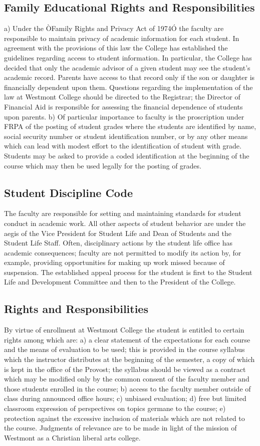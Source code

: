 \documentclass[letterpaper, 11pt]{article}
\begin{document}
	\subsection{Family Educational Rights and Responsibilities}
		a) Under the ÒFamily Rights and Privacy Act of 1974Ó the faculty are responsible to maintain privacy of academic information for each student.  In agreement with the provisions of this law the College has established the guidelines regarding access to student information.  In particular, the College has decided that only the academic advisor of a given student may see the student's academic record.  Parents have access to that record only if the son or daughter is financially dependent upon them.  Questions regarding the implementation of the law at Westmont College should be directed to the Registrar; the Director of Financial Aid is responsible for assessing the financial dependence of students upon parents.
		b) Of particular importance to faculty is the proscription under FRPA of the posting of student grades where the students are identified by name, social security number or student identification number, or by any other means which can lead with modest effort to the identification of student with grade.  Students may be asked to provide a coded identification at the beginning of the course which may then be used legally for the posting of grades.
	\subsection{Student Discipline Code}
		The faculty are responsible for setting and maintaining standards for student conduct in academic work.  All other aspects of student behavior are under the aegis of the Vice President for Student Life and Dean of Students and the Student Life Staff.  Often, disciplinary actions by the student life office has academic consequences; faculty are not permitted to modify its action by, for example, providing opportunities for making up work missed because of suspension.  The established appeal process for the student is first to the Student Life and Development Committee and then to the President of the College.
	\subsection{Rights and Responsibilities}
		By virtue of enrollment at Westmont College the student is entitled to certain rights among which are:
		a) a clear statement of the expectations for each course and the means of evaluation to be used; this is provided in the course syllabus which the instructor distributes at the beginning of the semester, a copy of which is kept in the office of the Provost; the syllabus should be viewed as a contract which may be modified only by the common consent of the faculty member and those students enrolled in the course;
		b) access to the faculty member outside of class during announced office hours;
		c) unbiased evaluation;
		d) free but limited classroom expression of perspectives on topics germane to the course;
		e) protection against the excessive inclusion of materials which are not related to the course. Judgments of relevance are to be made in light of the mission of Westmont as a Christian liberal arts college.
\end{document}
